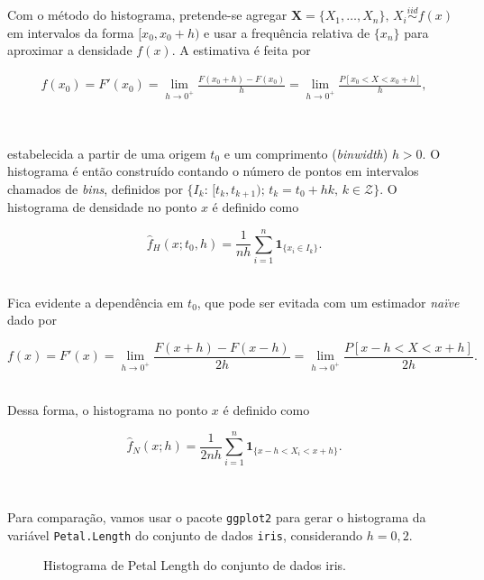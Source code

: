 \documentclass[
  a4paperpaper,
]{article}
\begin{document}
Com o método do histograma, pretende-se agregar
\(\mathbf{X} = \{ X_1, \dots, X_n\}, \, X_i \overset{iid}{\sim} f(x)\)
em intervalos da forma \([ x_0, x_0+h)\) e usar a frequência relativa de
\(\{x_n\}\) para aproximar a densidade \(f(x)\). A estimativa é feita
por

\begin{align}
f(x_0) = F'(x_0) = \lim_{h\to 0^+} \frac{F(x_0 + h) - F(x_0)}{h} = \lim_{h\to 0^+} \frac{P[x_0 < X < x_0 + h]}{h} \label{eq:histograma},
\end{align}

~

\noindent estabelecida a partir de uma origem \(t_0\) e um comprimento
(\emph{binwidth}) \(h > 0\). O histograma é então construído contando o
número de pontos em intervalos chamados de \emph{bins}, definidos por
\(\{ I_k : \, [t_k, t_{k+1}); \, t_k = t_0 + hk, \, k \in \mathcal{Z} \}\).
O histograma de densidade no ponto \(x\) é definido como

\[
\hat{f}_H(x; t_0, h) = \frac{1}{nh} \sum_{i=1}^n \mathbf{1}_{ \{x_i \in I_k \} }.
\] ~

Fica evidente a dependência em \(t_0\), que pode ser evitada com um
estimador \emph{naïve} dado por

\[
f(x) = F'(x) = \lim_{h\to 0^+} \frac{F(x+h) - F(x-h)}{2h} = \lim_{h\to 0^+} \frac{P[x-h < X < x+h]}{2h}.
\] ~

\noindent Dessa forma, o histograma no ponto \(x\) é definido como

\[
\hat{f}_N(x;h) = \frac{1}{2nh} \sum_{i=1}^n \mathbf{1}_{ \{ x-h < X_i < x+h \} }.
\]

~

Para comparação, vamos usar o pacote \texttt{ggplot2} para gerar o
histograma da variável \texttt{Petal.Length} do conjunto de dados
\texttt{iris}, considerando \(h = 0,2\).

\begin{figure}[H]


\caption{\label{fig-histogramairis}Histograma de Petal Length do
conjunto de dados iris.}

\end{figure}%
\end{document}
